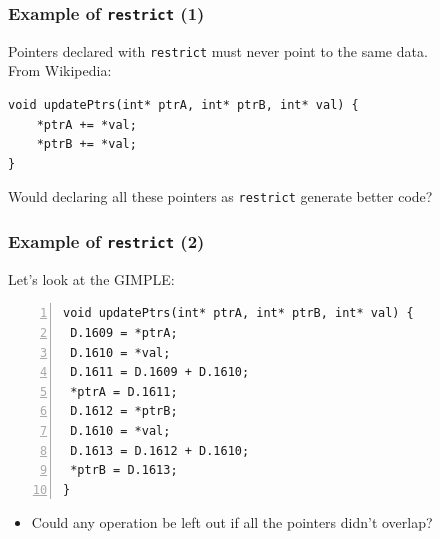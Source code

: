 \documentclass[aspectratio=43]{beamer}
\newenvironment{changemargin}[1]{%
  \begin{list}{}{%
    \setlength{\topsep}{0pt}%
    \setlength{\leftmargin}{#1}%
    \setlength{\rightmargin}{1em}
    \setlength{\listparindent}{\parindent}%
    \setlength{\itemindent}{\parindent}%
    \setlength{\parsep}{\parskip}%
  }%
  \item[]}{\end{list}}
\begin{document}
\begin{frame}[fragile]
  \frametitle{Example of {\tt restrict} (1)}

  \begin{changemargin}{2.5cm}
    Pointers declared with {\tt restrict} must
       never point to the same data.
~\\[1em]
    From Wikipedia:

  \begin{lstlisting}
void updatePtrs(int* ptrA, int* ptrB, int* val) {
    *ptrA += *val;
    *ptrB += *val;
}
  \end{lstlisting}
 Would declaring all these pointers as
      {\tt restrict} generate better code?
  \end{changemargin}

\end{frame}

\begin{frame}[fragile]
  \frametitle{Example of {\tt restrict} (2)}

  \begin{changemargin}{2.5cm}
    Let's look at the GIMPLE:

  \begin{lstlisting}[numbers=left]
void updatePtrs(int* ptrA, int* ptrB, int* val) {
 D.1609 = *ptrA;
 D.1610 = *val;
 D.1611 = D.1609 + D.1610;
 *ptrA = D.1611;
 D.1612 = *ptrB;
 D.1610 = *val;
 D.1613 = D.1612 + D.1610;
 *ptrB = D.1613;
}
  \end{lstlisting}

  \begin{itemize}
    \item Could any operation be left out if all the pointers
      didn't overlap?
  \end{itemize}  
  \end{changemargin}

\end{frame}
\end{document}

